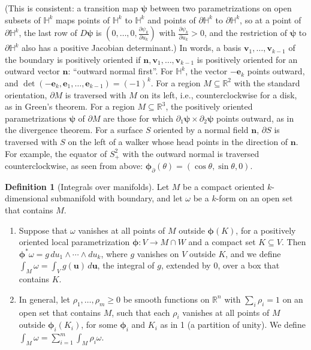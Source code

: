 \documentclass[11pt]{article}
\theoremstyle{definition}
\newtheorem{definition}{Definition}[section]
\theoremstyle{plain}
\theoremstyle{remark}
\begin{document}
(This is consistent: a transition map $\boldsymbol{\psi}$ between two parametrizations on open subsets of $\mathbb{H}^k$ maps points of $\mathbb{H}^k$ to $\mathbb{H}^k$ and points of $\partial\mathbb{H}^k$ to $\partial\mathbb{H}^k$, so at a point of $\partial\mathbb{H}^k$, the last row of $D\boldsymbol{\psi}$ is $(0, \ldots, 0, \frac{\partial\psi_k}{\partial u_k})$ with $\frac{\partial\psi_k}{\partial u_k} > 0$, and the restriction of $\boldsymbol{\psi}$ to $\partial\mathbb{H}^k$ also has a positive Jacobian determinant.) In words, a basis $\mathbf{v}_1, \ldots, \mathbf{v}_{k-1}$ of the boundary is positively oriented if $\mathbf{n}, \mathbf{v}_1, \ldots, \mathbf{v}_{k-1}$ is positively oriented for an outward vector $\mathbf{n}$: ``outward normal first''. For $\mathbb{H}^k$, the vector $-\mathbf{e}_k$ points outward, and $\det(-\mathbf{e}_k, \mathbf{e}_1, \ldots, \mathbf{e}_{k-1}) = (-1)^k$. For a region $M \subseteq \mathbb{R}^2$ with the standard orientation, $\partial M$ is traversed with $M$ on its left, i.e., counterclockwise for a disk, as in Green's theorem. For a region $M \subseteq \mathbb{R}^3$, the positively oriented parametrizations $\boldsymbol{\psi}$ of $\partial M$ are those for which $\partial_1\boldsymbol{\psi} \times \partial_2\boldsymbol{\psi}$ points outward, as in the divergence theorem. For a surface $S$ oriented by a normal field $\mathbf{n}$, $\partial S$ is traversed with $S$ on the left of a walker whose head points in the direction of $\mathbf{n}$. For example, the equator of $S^2_+$ with the outward normal is traversed counterclockwise, as seen from above: $\boldsymbol{\phi}_\partial(\theta) = (\cos\theta, \sin\theta, 0)$.

\begin{definition}[Integrals over manifolds]\label{def:manifold-integral}
    Let $M$ be a compact oriented $k$-dimensional submanifold with boundary, and let $\omega$ be a $k$-form on an open set that contains $M$.
    \begin{enumerate}
        \item Suppose that $\omega$ vanishes at all points of $M$ outside $\boldsymbol{\phi}(K)$, for a positively oriented local parametrization $\boldsymbol{\phi}: V \to M \cap W$ and a compact set $K \subseteq V$. Then $\boldsymbol{\phi}^*\omega = g\, du_1 \wedge \cdots \wedge du_k$, where $g$ vanishes on $V$ outside $K$, and we define $\int_M \omega = \int_V g(\mathbf{u})\, d\mathbf{u}$, the integral of $g$, extended by $0$, over a box that contains $K$.
        \item In general, let $\rho_1, \ldots, \rho_m \geq 0$ be smooth functions on $\mathbb{R}^n$ with $\sum_i \rho_i = 1$ on an open set that contains $M$, such that each $\rho_i$ vanishes at all points of $M$ outside $\boldsymbol{\phi}_i(K_i)$, for some $\boldsymbol{\phi}_i$ and $K_i$ as in 1 (a partition of unity). We define $\int_M \omega = \sum_{i=1}^m \int_M \rho_i\omega$.
    \end{enumerate}
\end{definition}
\end{document}
